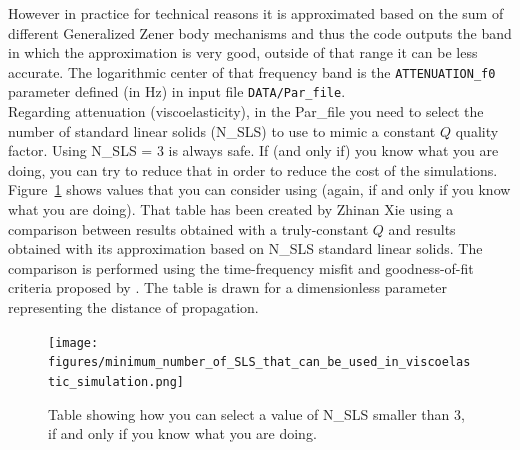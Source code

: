 \noindent
However in practice for technical reasons it is approximated based on the sum of different Generalized Zener body mechanisms
and thus the code outputs the band in which the approximation is very good, outside of that range it can be less accurate.
The logarithmic center of that frequency band is the \texttt{ATTENUATION\_f0} parameter defined (in Hz) in input file \texttt{DATA/Par\_file}. \\

\noindent
Regarding attenuation (viscoelasticity), in the Par\_file you need to select the number of standard linear solids (N\_SLS) to use to mimic a constant $Q$ quality factor.
Using N\_SLS = 3 is always safe. If (and only if) you know what you are doing, you can try to reduce that in order to reduce the cost of the simulations.
Figure~\ref{fig:selectNSLS} shows values that you can consider using (again, if and only if you know what you are doing). That table has been created by Zhinan Xie using
a comparison between results obtained with a truly-constant $Q$ and results obtained with its approximation based on N\_SLS standard linear solids.
The comparison is performed using the time-frequency misfit and goodness-of-fit criteria proposed by \cite{Kristekova_2009}.
The table is drawn for a dimensionless parameter representing the distance of propagation.
\begin{figure}[htbp]
\centering
\texttt{[image: figures/minimum\_number\_of\_SLS\_that\_can\_be\_used\_in\_viscoelastic\_simulation.png]}
\caption{Table showing how you can select a value of N\_SLS smaller than 3, if and only if you know what you are doing.}
\label{fig:selectNSLS}
\end{figure}

